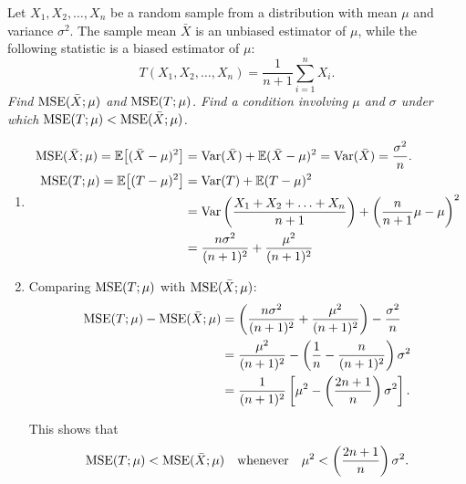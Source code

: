 \begin{example}
Let $X_1,X_2,\ldots,X_n$ be a random sample from a distribution with mean $\mu$ and variance $\sigma^2$. The sample mean $\bar{X}$ is an unbiased estimator of $\mu$, while the following statistic is a biased estimator of $\mu$:
\[
T(X_1,X_2,\ldots,X_n) = \frac{1}{n+1}\sum_{i=1}^n X_i.
\]
\ben
\it Find $\text{MSE}(\bar{X};\mu)$ and $\text{MSE}(T;\mu)$.
\it Find a condition involving $\mu$ and $\sigma$ under which $\text{MSE}(T;\mu) < \text{MSE}(\bar{X};\mu)$.
\een

\begin{solution}
\begin{enumerate}
\item
\begin{align*}
\text{MSE}(\bar{X};\mu) 
	= \mathbb{E}\big[(\bar{X}-\mu)^2\big] 
	& = \text{Var}(\bar{X}) + \mathbb{E}(\bar{X}-\mu)^2 
	= \text{Var}(\bar{X}) 
	= \frac{\sigma^2}{n}. \\
\text{MSE}(T;\mu)
	= \mathbb{E}\big[(T-\mu)^2\big] 
	& = \text{Var}(T) + \mathbb{E}(T-\mu)^2 \\
	& = \text{Var}\left(\frac{X_1+X_2+\ldots+X_n}{n+1}\right) + \left(\frac{n}{n+1}\mu - \mu\right)^2 \\
	& = \frac{n\sigma^2}{(n+1)^2} + \frac{\mu^2}{(n+1)^2}
\end{align*}
\item
Comparing $\text{MSE}(T;\mu)$ with $\text{MSE}(\bar{X};\mu)$:
\begin{align*}
\text{MSE}(T;\mu) - \text{MSE}(\bar{X};\mu)
	& = \left(\frac{n\sigma^2}{(n+1)^2} + \frac{\mu^2}{(n+1)^2}\right) - \frac{\sigma^2}{n} \\
	& = \frac{\mu^2}{(n+1)^2} - \left(\frac{1}{n} - \frac{n}{(n+1)^2}\right)\sigma^2 \\
	& = \frac{1}{(n+1)^2}\left[\mu^2 - \left(\frac{2n+1}{n}\right)\sigma^2\right].
\end{align*}

This shows that 
\[
\text{MSE}(T;\mu) < \text{MSE}(\bar{X};\mu) \text{\quad whenever\quad} \mu^2 < \left(\frac{2n+1}{n}\right)\sigma^2.
\]
\end{enumerate}
\end{solution}
\end{example}


